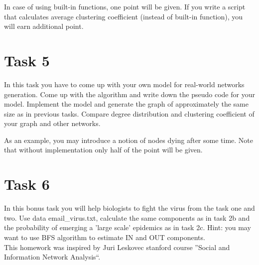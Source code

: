 \documentclass{article}
\begin{document}
In case of using built-in functions, one point will be given. If you write a script that calculates average clustering coefficient (instead of built-in function), you will earn additional point.

\section*{Task 5}
In this task you have to come up with your own model for real-world networks generation. Come up with the algorithm and write down the pseudo code for your model. Implement the model and generate the graph of approximately the same size as in previous tasks. Compare degree distribution and clustering coefficient of your graph and other networks.

As an example, you may introduce a notion of nodes dying after some time.
Note that without implementation only half of the point will be given.

\section*{Task 6}
In this bonus task you will help biologists to fight the virus from the task one and two. Use data email\_virus.txt, calculate the same components as in task 2b and the probability of emerging a 'large scale' epidemics as in task 2c. Hint: you may want to use BFS algorithm to estimate IN and OUT components.
\medskip
\\
This homework was inspired by Juri Leskovec stanford course ''Social and Information Network Analysis``. 
\end{document}
